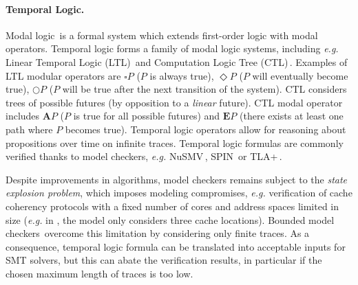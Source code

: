 
\paragraph{Temporal Logic.}
%
Modal logic\,\cite{chagrov1997modal} is a formal system which extends
first-order logic with modal operators.
%
Temporal logic forms a family of modal logic systems, including \emph{e.g.}
Linear Temporal Logic (LTL)\,\cite{sistla1985ltl} and Computation Logic Tree
(CTL)\,\cite{clarke1981ctl}.
%
Examples of LTL modular operators are \( \square P \) (\( P \) is always true),
\( \Diamond P \) (\( P \) will eventually become true), \( \bigcirc P \)
(\( P \) will be true after the next transition of the system).
%
CTL considers trees of possible futures (by opposition to a \emph{linear}
future).
%
CTL modal operator includes \( \mathbf{A} P \) (\( P \) is true for all possible
futures) and \( \mathbf{E} P \) (there exists at least one path where \( P \)
becomes true).
%
Temporal logic operators allow for reasoning about propositions over time on
infinite traces.
%
Temporal logic formulas are commonly verified thanks to model checkers,
\emph{e.g.}  NuSMV\,\cite{cimatti2002nusmv}, SPIN\,\cite{holzmann1997spin} or
TLA+\,\cite{lamport2002tla}.

Despite improvements in algorithms, model checkers remains subject to the
\emph{state explosion problem}, which imposes modeling compromises, \emph{e.g.}
verification of cache coherency protocols with a fixed number of cores and
address spaces limited in size (\emph{e.g.} in \cite{lie2003xom}, the model only
considers three cache locations).
%
%
Bounded model checkers\,\cite{biere2003bounded} overcome this limitation by considering only finite
traces.
%
As a consequence, temporal logic formula can be translated into acceptable
inputs for SMT solvers, but this can abate the verification results, in
particular if the chosen maximum length of traces is too low.

